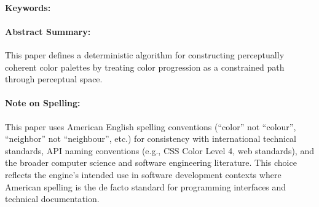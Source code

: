 






\maketitle

\begin{abstract}
\abstracttext
\end{abstract}

\paragraph*{Keywords:} \keywords

\vspace{1em}

\paragraph*{Abstract Summary:} 
This paper defines a deterministic algorithm for constructing perceptually coherent color palettes by treating color progression as a constrained path through perceptual space.


\vspace{1em}
\paragraph*{Note on Spelling:} 
This paper uses American English spelling conventions (``color'' not ``colour'', ``neighbor'' not ``neighbour'', etc.) for consistency with international technical standards, API naming conventions (e.g., CSS Color Level 4, web standards), and the broader computer science and software engineering literature. This choice reflects the engine's intended use in software development contexts where American spelling is the de facto standard for programming interfaces and technical documentation.

